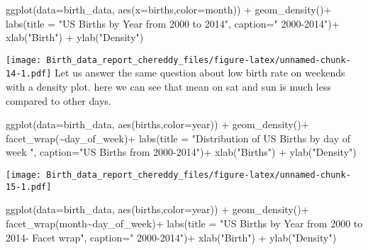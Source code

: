 \documentclass[
]{article}
\newenvironment{Shaded}{\begin{snugshade}}{\end{snugshade}}
\newcommand{\AttributeTok}[1]{\textcolor[rgb]{0.77,0.63,0.00}{#1}}
\newcommand{\FunctionTok}[1]{\textcolor[rgb]{0.00,0.00,0.00}{#1}}
\newcommand{\NormalTok}[1]{#1}
\newcommand{\SpecialCharTok}[1]{\textcolor[rgb]{0.00,0.00,0.00}{#1}}
\newcommand{\StringTok}[1]{\textcolor[rgb]{0.31,0.60,0.02}{#1}}
\begin{document}
\begin{Shaded}
\begin{Highlighting}[]
\FunctionTok{ggplot}\NormalTok{(}\AttributeTok{data=}\NormalTok{birth\_data, }\FunctionTok{aes}\NormalTok{(}\AttributeTok{x=}\NormalTok{births,}\AttributeTok{color=}\NormalTok{month)) }\SpecialCharTok{+} 
  \FunctionTok{geom\_density}\NormalTok{()}\SpecialCharTok{+}
  \FunctionTok{labs}\NormalTok{(}\AttributeTok{title =} \StringTok{"US Births by Year from 2000 to 2014"}\NormalTok{,}
       \AttributeTok{caption=}\StringTok{" 2000{-}2014"}\NormalTok{)}\SpecialCharTok{+}
  \FunctionTok{xlab}\NormalTok{(}\StringTok{"Birth"}\NormalTok{) }\SpecialCharTok{+}
  \FunctionTok{ylab}\NormalTok{(}\StringTok{"Density"}\NormalTok{)}
\end{Highlighting}
\end{Shaded}

\texttt{[image: Birth\_data\_report\_chereddy\_files/figure-latex/unnamed-chunk-14-1.pdf]}
Let us answer the same question about low birth rate on weekends with a
density plot. here we can see that mean on sat and sun is much less
compared to other days.

\begin{Shaded}
\begin{Highlighting}[]
\FunctionTok{ggplot}\NormalTok{(}\AttributeTok{data=}\NormalTok{birth\_data, }\FunctionTok{aes}\NormalTok{(births,}\AttributeTok{color=}\NormalTok{year)) }\SpecialCharTok{+} 
  \FunctionTok{geom\_density}\NormalTok{()}\SpecialCharTok{+}
  \FunctionTok{facet\_wrap}\NormalTok{(}\SpecialCharTok{\textasciitilde{}}\NormalTok{day\_of\_week)}\SpecialCharTok{+}
  \FunctionTok{labs}\NormalTok{(}\AttributeTok{title =} \StringTok{"Distribution of US Births by day of week "}\NormalTok{,}
       \AttributeTok{caption=}\StringTok{"US Births from 2000{-}2014"}\NormalTok{)}\SpecialCharTok{+}
  \FunctionTok{xlab}\NormalTok{(}\StringTok{"Births"}\NormalTok{) }\SpecialCharTok{+}
  \FunctionTok{ylab}\NormalTok{(}\StringTok{"Density"}\NormalTok{)}
\end{Highlighting}
\end{Shaded}

\texttt{[image: Birth\_data\_report\_chereddy\_files/figure-latex/unnamed-chunk-15-1.pdf]}

\begin{Shaded}
\begin{Highlighting}[]
\FunctionTok{ggplot}\NormalTok{(}\AttributeTok{data=}\NormalTok{birth\_data, }\FunctionTok{aes}\NormalTok{(births,}\AttributeTok{color=}\NormalTok{year)) }\SpecialCharTok{+} 
  \FunctionTok{geom\_density}\NormalTok{()}\SpecialCharTok{+}
  \FunctionTok{facet\_wrap}\NormalTok{(month}\SpecialCharTok{\textasciitilde{}}\NormalTok{day\_of\_week)}\SpecialCharTok{+}
  \FunctionTok{labs}\NormalTok{(}\AttributeTok{title =} \StringTok{"US Births by Year from 2000 to 2014{-} Facet wrap"}\NormalTok{,}
       \AttributeTok{caption=}\StringTok{" 2000{-}2014"}\NormalTok{)}\SpecialCharTok{+}
  \FunctionTok{xlab}\NormalTok{(}\StringTok{"Birth"}\NormalTok{) }\SpecialCharTok{+}
  \FunctionTok{ylab}\NormalTok{(}\StringTok{"Density"}\NormalTok{)}
\end{Highlighting}
\end{Shaded}
\end{document}
